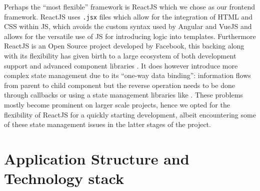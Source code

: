 \documentclass{l4proj}
\begin{document}
Perhaps the ``most flexible'' framework is ReactJS which we chose as our frontend framework.
ReactJS uses \lstinline{.jsx} files which allow for the integration of HTML and CSS within JS, which avoids the custom syntax used by Angular and VueJS and allows for the versatile use of JS for introducing logic into templates.
Furthermore ReactJS is an Open Source project developed by Facebook, this backing along with its flexibility has given birth to a large ecosystem of both development support and advanced component libraries \autocite{wohlgethanSupportingWebDevelopmentDecisions2018}.
It does however introduce more complex state management due to its ``one-way data binding'': information flows from parent to child component but the reverse operation needs to be done through callbacks or using a state management libraries like \textcite{Redux2020}.
These problems mostly become prominent on larger scale projects, hence we opted for the flexibility of ReactJS for a quickly starting development, albeit encountering some of these state management issues in the latter stages of the project.

\section{Application Structure and Technology stack}
\end{document}
